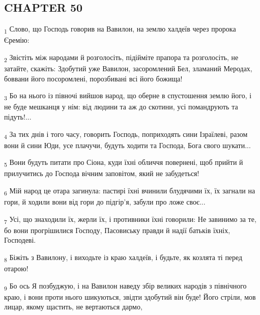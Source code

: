 \subsection{CHAPTER 50}
\begin{tcolorbox}
\textsubscript{1} Слово, що Господь говорив на Вавилон, на землю халдеїв через пророка Єремію:
\end{tcolorbox}
\begin{tcolorbox}
\textsubscript{2} Звістіть між народами й розголосіть, підійміте прапора та розголосіть, не затайте, скажіть: Здобутий уже Вавилон, засоромлений Бел, зламаний Меродах, боввани його посоромлені, порозбивані всі його божища!
\end{tcolorbox}
\begin{tcolorbox}
\textsubscript{3} Бо на нього із півночі вийшов народ, що оберне в спустошення землю його, і не буде мешканця у нім: від людини та аж до скотини, усі помандрують та підуть!...
\end{tcolorbox}
\begin{tcolorbox}
\textsubscript{4} За тих днів і того часу, говорить Господь, поприходять сини Ізраїлеві, разом вони й сини Юди, усе плачучи, будуть ходити та Господа, Бога свого шукати...
\end{tcolorbox}
\begin{tcolorbox}
\textsubscript{5} Вони будуть питати про Сіона, куди їхні обличчя повернені, щоб прийти й прилучитись до Господа вічним заповітом, який не забудеться!
\end{tcolorbox}
\begin{tcolorbox}
\textsubscript{6} Мій народ це отара загинула: пастирі їхні вчинили блудячими їх, їх загнали на гори, й ходили вони від гори до підгір'я, забули про ложе своє...
\end{tcolorbox}
\begin{tcolorbox}
\textsubscript{7} Усі, що знаходили їх, жерли їх, і противники їхні говорили: Не завинимо за те, бо вони прогрішилися Господу, Пасовиську правди й надії батьків їхніх, Господеві.
\end{tcolorbox}
\begin{tcolorbox}
\textsubscript{8} Біжіть з Вавилону, і виходьте із краю халдеїв, і будьте, як козлята ті перед отарою!
\end{tcolorbox}
\begin{tcolorbox}
\textsubscript{9} Бо ось Я позбуджую, і на Вавилон наведу збір великих народів з північного краю, і вони проти нього шикуються, звідти здобутий він буде! Його стріли, мов лицар, якому щастить, не вертаються дармо,
\end{tcolorbox}

